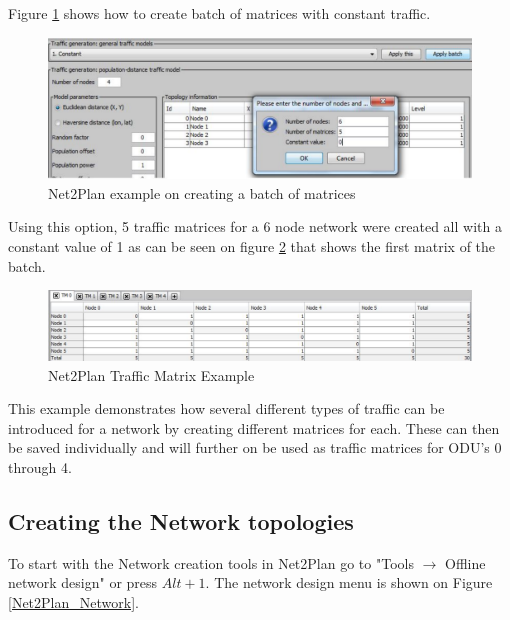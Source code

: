 	Figure \ref{TrafficMatrixCreation} shows how to create batch of matrices with constant traffic.
	
	\begin{figure}[h!]
		\centering
		\includegraphics[width = 13cm]{TrafficMatrixCreation.pdf}
		\caption{Net2Plan example on creating a batch of matrices }
		\label{TrafficMatrixCreation}
	\end{figure} 	
	
	Using this option, 5 traffic matrices for a 6 node network were created all with a constant value of 1 as can be seen on figure \ref{Net2Plan_matrix} that shows the first matrix of the batch.

	\begin{figure}[h!]
		\centering
		\includegraphics[width = 13cm]{Net2Plan_matrix.pdf}
		\caption{Net2Plan Traffic Matrix Example}
		\label{Net2Plan_matrix}
	\end{figure}
	
	This example demonstrates how several different types of traffic can be introduced for a network by creating different matrices for each. These can then be saved individually and will further on be used as traffic matrices for ODU's 0 through 4.
	
		
	\subsection*{Creating the Network topologies} \label{Creating the Network topologies}
	To start with the Network creation tools in Net2Plan go to "Tools $\rightarrow$ Offline network design" or press $Alt+1$. The network design menu is shown on Figure \ref{Net2Plan_Network}.
	
